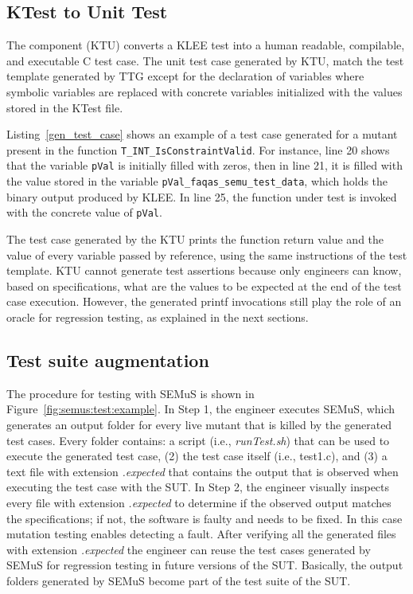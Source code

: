 

\subsection{KTest to Unit Test}





The component  (KTU) converts a KLEE test into a human readable, compilable, and executable C test case. The unit test case generated by KTU, match the test template generated by TTG except for the declaration of variables where symbolic variables are replaced with concrete variables initialized with the values stored in the KTest file.

Listing~\ref{gen_test_case} shows an example of a test case generated for a mutant present in the function \texttt{T\_INT\_Is\-ConstraintValid}. For instance, line 20 shows that the variable \texttt{pVal} is initially filled with zeros, then in line 21, it is filled with the value stored in the variable \texttt{pVal\_faqas\_semu\_test\_data}, which holds the binary output produced by KLEE. In line 25, the function under test is invoked with the concrete value of \texttt{pVal}.

The test case generated by the KTU prints the function return value and the value of every variable passed by reference, using the same instructions of the test template.
KTU cannot generate test assertions because only engineers can know, based on specifications, what are the values to be expected at the end of the test case execution.
However, the generated printf invocations still play the role of an oracle for regression testing, as explained in the next sections.

\subsection{Test suite augmentation}
\label{sec:Semus:augment}
The procedure for testing with SEMuS is shown in Figure~\ref{fig:semus:test:example}.
In Step 1, the engineer executes SEMuS, which generates an output folder for every live mutant that is killed by the generated test cases.
Every folder contains: a script (i.e., \emph{runTest.sh}) that can be used to execute the generated test case, (2) the test case itself (i.e., test1.c), and (3) a text file with extension \emph{.expected} that contains the output that is observed when executing the test case with the SUT.
In Step 2, the engineer visually inspects every file with extension \emph{.expected} to determine if the observed output matches the specifications; if not, the software is faulty and needs to be fixed. In this case mutation testing enables detecting a fault.
After verifying all the generated files with extension \emph{.expected} the engineer can reuse the test cases generated by SEMuS for regression testing in future versions of the SUT. Basically, the output folders generated by SEMuS become part of the test suite of the SUT.

